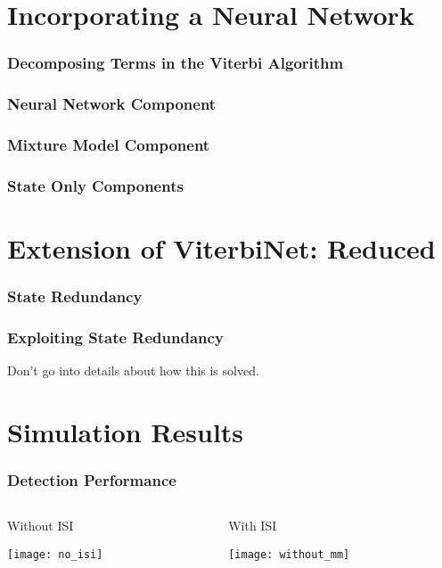 \documentclass[10pt,tgadventor, onlymath]{beamer}
\begin{document}
\section{Incorporating a Neural Network}

\begin{frame}
	\frametitle{Decomposing Terms in the Viterbi Algorithm}


\end{frame}

\begin{frame}
	\frametitle{Neural Network Component}

\end{frame}

\begin{frame}
	\frametitle{Mixture Model Component}

\end{frame}

\begin{frame}
	\frametitle{State Only Components}

\end{frame}




\section{Extension of ViterbiNet: Reduced}
\begin{frame}
	\frametitle{State Redundancy}

\end{frame}

\begin{frame}
	\frametitle{Exploiting State Redundancy}
Don't go into details about how this is solved.
\end{frame}


\section{Simulation Results}

\begin{frame}
\frametitle{Detection Performance}
\begin{columns}
\begin{column}{0.5\linewidth}
	Without ISI

	\texttt{[image: no\_isi]}
\end{column}
\begin{column}{0.5\linewidth}
	With ISI

	\texttt{[image: without\_mm]}

\end{column}
\end{columns}
\end{frame}
\end{document}
